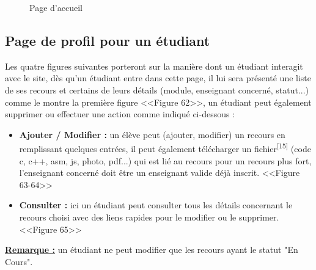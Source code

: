 \documentclass[12pt]{report}
\begin{document}
\newpage

\begin{figure}[h]
\centering
\caption{Page d'accueil}
\end{figure}

\subsection{Page de profil pour un étudiant}

Les quatre figures suivantes porteront sur la manière dont un étudiant interagit avec le site, dès qu'un étudiant entre dans cette page, il lui sera présenté une liste de ses recours et certains de leurs détails (module, enseignant concerné, statut...) comme le montre la première figure <<Figure 62>>, un étudiant peut également supprimer ou effectuer une action comme indiqué ci-dessous :

\begin{itemize}
  \item \textbf{Ajouter / Modifier :} un élève peut (ajouter, modifier) un recours en remplissant quelques entrées, il peut également télécharger un fichier\textsuperscript{[15]} (code c, c++, asm, js, photo, pdf...) qui est lié au recours pour un recours plus fort, l'enseignant concerné doit être un enseignant valide déjà inscrit. <<Figure 63-64>>
  \item \textbf{Consulter :} ici un étudiant peut consulter tous les détails concernant le recours choisi avec des liens rapides pour le modifier ou le supprimer. <<Figure 65>>
\end{itemize}
\textbf{\uline{Remarque :}} un étudiant ne peut modifier que les recours ayant le statut "En Cours".
\end{document}

